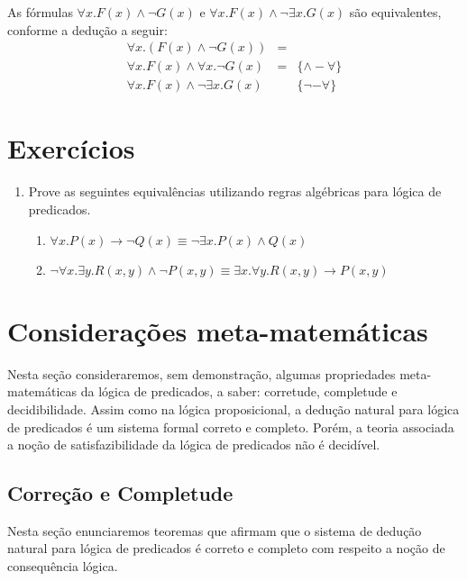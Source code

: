 \begin{Example}
As fórmulas $\forall x. F(x) \land \neg G(x)$ e $\forall x. F(x) \land
\neg \exists x. G(x)$ são equivalentes, conforme a dedução a seguir:
\[
      \begin{array}{lcl}
          \forall x.(F(x)\land\neg G(x)) & = & \\
	 \forall x.F(x)\land\forall x.\neg G(x) & = &\{\land-\forall\}\\
         \forall x.F(x)\land\neg\exists x.G(x) &  & \{\neg-\forall\}
      \end{array}
\]
\end{Example}

\section{Exercícios}

\begin{enumerate}
         \item Prove as seguintes equival\^encias utilizando regras alg\'ebricas para l\'ogica de predicados.
         \begin{enumerate}
            \item $\forall x. P(x) \rightarrow \neg Q(x) \equiv \neg \exists x. P(x) \land Q(x)$
            \item $\neg \forall x.\exists y. R(x,y)\land \neg P(x,y)\equiv\exists x.\forall y.R(x,y)\rightarrow P(x,y)$
         \end{enumerate}
\end{enumerate}

\section{Considerações meta-matemáticas}

Nesta seção consideraremos, sem demonstração, algumas propriedades
meta-matemáticas da lógica de predicados, a saber: corretude,
completude e decidibilidade. Assim como na lógica proposicional, a
dedução natural para lógica de predicados é um sistema formal correto
e completo. Porém, a teoria associada a noção de satisfazibilidade da
lógica de predicados não é decidível.

\subsection{Correção e Completude}

Nesta seção enunciaremos teoremas que afirmam que o sistema de dedução
natural para lógica de predicados é correto e completo com respeito a
noção de consequência lógica.

